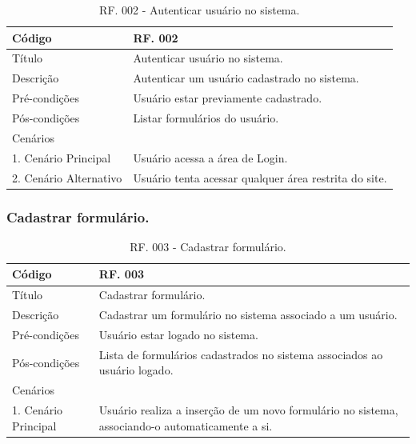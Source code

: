\documentclass[11pt]{article}
\begin{document}
        \begin{table}[h]
          \begin{center}
            \begin{tabular}{ | p{5cm} | p{10cm} | }
              \hline
              Código\cellcolor{gray} & RF. 002\cellcolor{gray} \\
              \hline
              Título & Autenticar usuário no sistema. \\
              \hline
              Descrição & Autenticar um usuário cadastrado no sistema. \\
              \hline
              Pré-condições & Usuário estar previamente cadastrado. \\
              \hline
              Pós-condições & Listar formulários do usuário. \\
              \hline
              Cenários &   \\
              \hline
              1.  Cenário Principal & Usuário acessa a área de Login. \\
              \hline
              2.  Cenário Alternativo & Usuário tenta acessar qualquer área restrita do site. \\
              \hline
            \end{tabular}
            \caption{RF. 002 - Autenticar usuário no sistema.}
          \end{center}
        \end{table}

    \clearpage

      \subsubsection{Cadastrar formulário.}

        \begin{table}[h]
          \begin{center}
            \begin{tabular}{ | p{5cm} | p{10cm} | }
              \hline
              Código\cellcolor{gray} & RF. 003\cellcolor{gray} \\
              \hline
              Título & Cadastrar formulário. \\
              \hline
              Descrição & Cadastrar um formulário no sistema associado a um usuário. \\
              \hline
              Pré-condições & Usuário estar logado no sistema. \\
              \hline
              Pós-condições & Lista de formulários cadastrados no sistema associados ao usuário logado. \\
              \hline
              Cenários &   \\
              \hline
              1.  Cenário Principal & Usuário realiza a inserção de um novo formulário no sistema, associando-o automaticamente a si. \\
              \hline
            \end{tabular}
            \caption{RF. 003 - Cadastrar formulário.}
          \end{center}
        \end{table}
    
\end{document}
